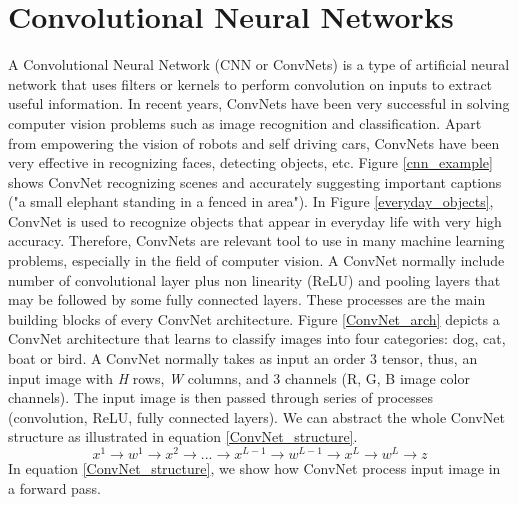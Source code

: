 \documentclass[master]{thesis-uestc}
\begin{document}
\section{Convolutional Neural Networks}
A Convolutional Neural Network (CNN or ConvNets) is a type of artificial neural network that uses filters or kernels to perform convolution on inputs to extract useful information. In recent years, ConvNets have been very successful in solving computer vision problems such as image recognition and classification. Apart from empowering the vision of robots and self driving cars, ConvNets have been very effective in recognizing faces, detecting objects, etc. Figure \ref{cnn_example} shows ConvNet recognizing scenes and accurately suggesting important captions ("a small elephant standing in a fenced in area"). In Figure \ref{everyday_objects}, ConvNet is used to recognize objects that appear in everyday life with very high accuracy. Therefore, ConvNets are relevant tool to use in many machine learning problems, especially in the field of computer vision. A ConvNet normally include number of convolutional layer plus non linearity (ReLU) and pooling layers that may be followed by some fully connected layers. These processes are the main building blocks of every ConvNet architecture. Figure \ref{ConvNet_arch} depicts a ConvNet architecture that learns to classify images into four categories: dog, cat, boat or bird. A ConvNet normally takes as input an order 3 tensor, thus, an input image with \textit{H} rows, \textit{W} columns, and 3 channels (R, G, B image color channels). The input image is then passed through series of processes (convolution, ReLU, fully connected layers). We can abstract the whole ConvNet structure as illustrated in equation \ref{ConvNet_structure}.
\begin{equation}
x^1 \rightarrow \boxed{ w^1 } \rightarrow  x^2 \rightarrow ... \rightarrow  x^{L-1} \rightarrow \boxed{ w^{L-1} } \rightarrow  x^L  \rightarrow \boxed{ w^L }  \rightarrow z
\label{ConvNet_structure}
\end{equation}
In equation \ref{ConvNet_structure}, we show how ConvNet process input image in a forward pass.
\end{document}
